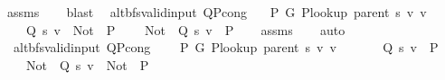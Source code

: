 \begin{isabellebody}
%
\isatagproof
{}\isamarkupfalse%
\ assms\isanewline
\ \ \isamarkupfalse%
\ blast%
\endisatagproof
{\isafoldproof}%
%
\isadelimproof
\isanewline
%
\endisadelimproof
\isanewline
{}\isamarkupfalse%
\ {\isacharparenleft}{\kern0pt}\ alt{\isacharunderscore}{\kern0pt}bfs{\isacharunderscore}{\kern0pt}valid{\isacharunderscore}{\kern0pt}input{\isacharparenright}{\kern0pt}\ Q{\isacharunderscore}{\kern0pt}P{\isacharprime}{\kern0pt}{\isacharprime}{\kern0pt}{\isacharunderscore}{\kern0pt}cong{\isacharcolon}{\kern0pt}\isanewline
\ \ \ {\isachardoublequoteopen}P{\isacharprime}{\kern0pt}\ G{}\ {\isacharparenleft}{\kern0pt}P{\isacharunderscore}{\kern0pt}lookup\ {\isacharparenleft}{\kern0pt}parent\ s{\isacharparenright}{\kern0pt}\ v{\isacharparenright}{\kern0pt}\ v{\isachardoublequoteclose}\isanewline
\ \ \isanewline
\ \ \ \ {\isachardoublequoteopen}Q\ s\ v\ {\isacharequal}{\kern0pt}\ {\isacharparenleft}{\kern0pt}Not\ {\isasymcirc}\ P{\isacharprime}{\kern0pt}{\isacharprime}{\kern0pt}{\isacharparenright}{\kern0pt}{\isachardoublequoteclose}\isanewline
\ \ \ \ {\isachardoublequoteopen}{\isacharparenleft}{\kern0pt}Not\ {\isasymcirc}\ Q\ s\ v{\isacharparenright}{\kern0pt}\ {\isacharequal}{\kern0pt}\ P{\isacharprime}{\kern0pt}{\isacharprime}{\kern0pt}{\isachardoublequoteclose}\isanewline
%
\isadelimproof
\ \ %
\endisadelimproof
%
\isatagproof
{}\isamarkupfalse%
\ assms\isanewline
\ \ \isamarkupfalse%
\ auto%
\endisatagproof
{\isafoldproof}%
%
\isadelimproof
\isanewline
%
\endisadelimproof
\isanewline
{}\isamarkupfalse%
\ {\isacharparenleft}{\kern0pt}\ alt{\isacharunderscore}{\kern0pt}bfs{\isacharunderscore}{\kern0pt}valid{\isacharunderscore}{\kern0pt}input{\isacharparenright}{\kern0pt}\ Q{\isacharunderscore}{\kern0pt}P{\isacharprime}{\kern0pt}{\isacharprime}{\kern0pt}{\isacharunderscore}{\kern0pt}cong{\isacharunderscore}{\kern0pt}{}{\isacharcolon}{\kern0pt}\isanewline
\ \ \ {\isachardoublequoteopen}{\isasymnot}\ P{\isacharprime}{\kern0pt}\ G{}\ {\isacharparenleft}{\kern0pt}P{\isacharunderscore}{\kern0pt}lookup\ {\isacharparenleft}{\kern0pt}parent\ s{\isacharparenright}{\kern0pt}\ v{\isacharparenright}{\kern0pt}\ v{\isachardoublequoteclose}\isanewline
\ \ \isanewline
\ \ \ \ {\isachardoublequoteopen}Q\ s\ v\ {\isacharequal}{\kern0pt}\ P{\isacharprime}{\kern0pt}{\isacharprime}{\kern0pt}{\isachardoublequoteclose}\isanewline
\ \ \ \ {\isachardoublequoteopen}{\isacharparenleft}{\kern0pt}Not\ {\isasymcirc}\ Q\ s\ v{\isacharparenright}{\kern0pt}\ {\isacharequal}{\kern0pt}\ {\isacharparenleft}{\kern0pt}Not\ {\isasymcirc}\ P{\isacharprime}{\kern0pt}{\isacharprime}{\kern0pt}{\isacharparenright}{\kern0pt}{\isachardoublequoteclose}\isanewline

\end{isabellebody}
